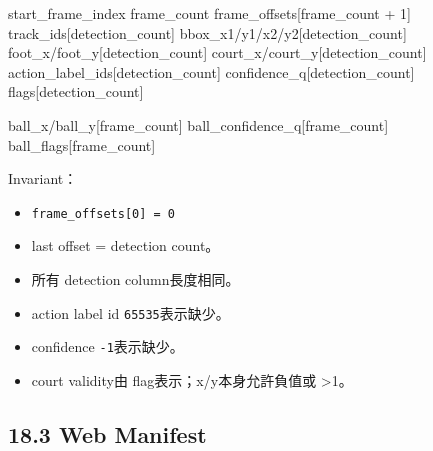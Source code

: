 \documentclass[
  9pt,
  a4paper,
]{article}
\newenvironment{Shaded}{}{}
\newcommand{\NormalTok}[1]{#1}
\providecommand{\tightlist}{%
  \setlength{\itemsep}{0pt}\setlength{\parskip}{0pt}}
\begin{document}
\begin{Shaded}
\begin{Highlighting}[]
\NormalTok{start\_\allowbreak{}frame\_\allowbreak{}index}
\NormalTok{frame\_\allowbreak{}count}
\NormalTok{frame\_\allowbreak{}offsets[frame\_\allowbreak{}count + 1]}
\NormalTok{track\_\allowbreak{}ids[detection\_\allowbreak{}count]}
\NormalTok{bbox\_\allowbreak{}x1/y1/x2/y2[detection\_\allowbreak{}count]}
\NormalTok{foot\_\allowbreak{}x/foot\_\allowbreak{}y[detection\_\allowbreak{}count]}
\NormalTok{court\_\allowbreak{}x/court\_\allowbreak{}y[detection\_\allowbreak{}count]}
\NormalTok{action\_\allowbreak{}label\_\allowbreak{}ids[detection\_\allowbreak{}count]}
\NormalTok{confidence\_\allowbreak{}q[detection\_\allowbreak{}count]}
\NormalTok{flags[detection\_\allowbreak{}count]}

\NormalTok{ball\_\allowbreak{}x/ball\_\allowbreak{}y[frame\_\allowbreak{}count]}
\NormalTok{ball\_\allowbreak{}confidence\_\allowbreak{}q[frame\_\allowbreak{}count]}
\NormalTok{ball\_\allowbreak{}flags[frame\_\allowbreak{}count]}
\end{Highlighting}
\end{Shaded}

Invariant：

\begin{itemize}
\tightlist
\item
  \texttt{frame\_\allowbreak{}offsets{[}0{]}\ =\ 0}
\item
  last offset = detection count。
\item
  所有 detection column長度相同。
\item
  action label id \texttt{65535}表示缺少。
\item
  confidence \texttt{-1}表示缺少。
\item
  court validity由 flag表示；x/y本身允許負值或 \textgreater1。
\end{itemize}

\subsection{18.3 Web Manifest}\label{183-web-manifest}
\end{document}
